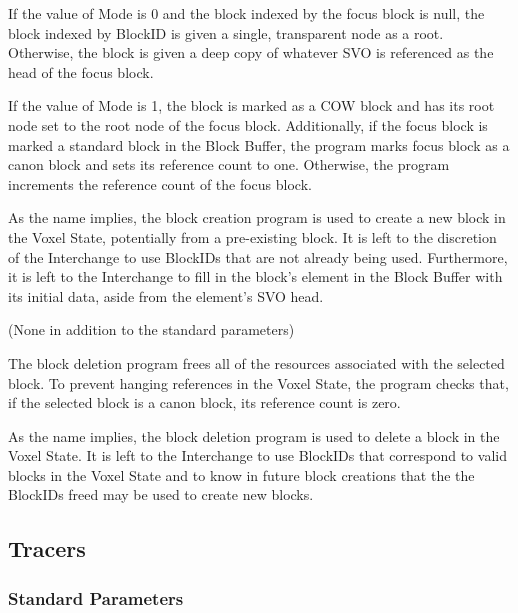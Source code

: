 \documentclass[onecolumn, draftclsnofoot,10pt, compsoc]{IEEEtran}
\newcounter{threesection}[subsubsection]
\newcounter{foursection}[threesection]
\begin{document}
If the value of Mode is 0 and the block indexed by the focus block is null, the block indexed by BlockID is given a single, transparent node as a root. Otherwise, the block is given a deep copy of whatever SVO is referenced as the head of the focus block.

If the value of Mode is 1, the block is marked as a COW block and has its root node set to the root node of the focus block. Additionally, if the focus block is marked a standard block in the Block Buffer, the program marks focus block as a canon block and sets its reference count to one. Otherwise, the program increments the reference count of the focus block.


As the name implies, the block creation program is used to create a new block in the Voxel State, potentially from a pre-existing block. It is left to the discretion of the Interchange to use BlockIDs that are not already being used. Furthermore, it is left to the Interchange to fill in the block’s element in the Block Buffer with its initial data, aside from the element’s SVO head.




(None in addition to the standard parameters)


The block deletion program frees all of the resources associated with the selected block. To prevent hanging references in the Voxel State, the program checks that, if the selected block is a canon block, its reference count is zero.


As the name implies, the block deletion program is used to delete a block in the Voxel State. It is left to the Interchange to use BlockIDs that correspond to valid blocks in the Voxel State and to know in future block creations that the the BlockIDs freed may be used to create new blocks.


\subsection{Tracers}

\subsubsection{Standard Parameters}
\end{document}
